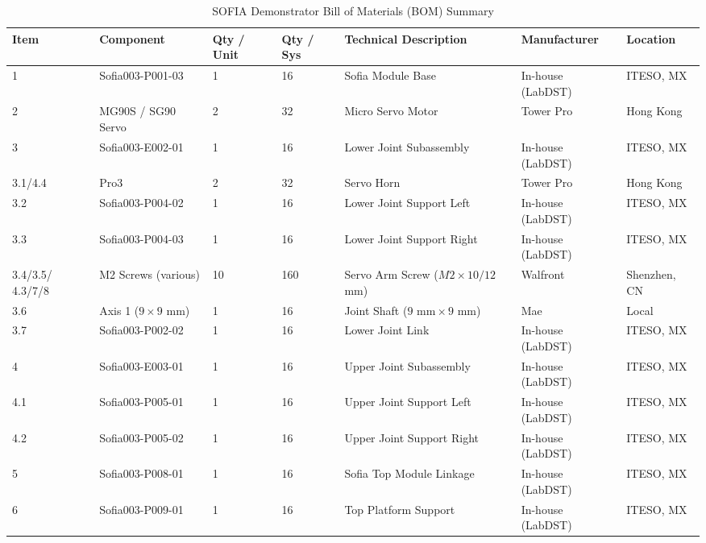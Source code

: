 \documentclass[lettersize,journal]{IEEEtran}
\begin{document}
	
	\begin{table}[!t]
		\centering
		\caption{SOFIA Demonstrator Bill of Materials (BOM) Summary}
		\label{tab:bom}
		\tiny
		
		\setlength{\tabcolsep}{1.5pt}
		\renewcommand{\arraystretch}{1.05}
		
		\begin{tabularx}{\columnwidth}{@{}P{0.8cm} P{2.0cm} P{0.5cm} P{0.5cm} P{2.4cm} P{1.1cm} P{0.8cm}@{}}
			\toprule
			\textbf{Item} & \textbf{Component} & \textbf{Qty / Unit} & \textbf{Qty / Sys} & \textbf{Technical Description} & \textbf{Manufacturer} & \textbf{Location} \\
			\midrule
			
			1 & Sofia003-P001-03 & 1 & 16 & Sofia Module Base & In-house (LabDST) & ITESO, MX \\
			2 & MG90S / SG90 Servo & 2 & 32 & Micro Servo Motor & Tower Pro & Hong Kong \\
			3 & Sofia003-E002-01 & 1 & 16 & Lower Joint Subassembly & In-house (LabDST) & ITESO, MX \\
			3.1/4.4 & Pro3 & 2 & 32 & Servo Horn & Tower Pro & Hong Kong \\
			3.2 & Sofia003-P004-02 & 1 & 16 & Lower Joint Support Left & In-house (LabDST) & ITESO, MX \\
			3.3 & Sofia003-P004-03 & 1 & 16 & Lower Joint Support Right & In-house (LabDST) & ITESO, MX \\
			3.4/3.5/ 4.3/7/8 & M2 Screws (various) & 10 & 160 & Servo Arm Screw ($M2 \times 10/12$ mm) & Walfront & Shenzhen, CN \\
			3.6 & Axis 1 ($9 \times 9$ mm) & 1 & 16 & Joint Shaft ($9\text{ mm} \times 9\text{ mm}$) & Mae & Local \\
			3.7 & Sofia003-P002-02 & 1 & 16 & Lower Joint Link & In-house (LabDST) & ITESO, MX \\
			4 & Sofia003-E003-01 & 1 & 16 & Upper Joint Subassembly & In-house (LabDST) & ITESO, MX \\
			4.1 & Sofia003-P005-01 & 1 & 16 & Upper Joint Support Left & In-house (LabDST) & ITESO, MX \\
			4.2 & Sofia003-P005-02 & 1 & 16 & Upper Joint Support Right & In-house (LabDST) & ITESO, MX \\
			5 & Sofia003-P008-01 & 1 & 16 & Sofia Top Module Linkage & In-house (LabDST) & ITESO, MX \\
			6 & Sofia003-P009-01 & 1 & 16 & Top Platform Support & In-house (LabDST) & ITESO, MX \\

\end{tabularx}
\end{table}
\end{document}
